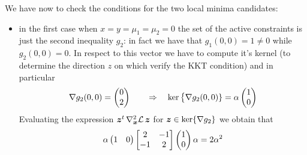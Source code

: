 \begin{example}{}
		We have now to check the conditions for the two local minima candidates:
		\begin{itemize}
			\item in the first case when $x=y = \mu_1 = \mu_2 = 0$ the set of the active constraints is just the second inequality $g_2$: in fact we have that $g_1(0,0) = 1 \neq 0$ while $g_2(0,0) = 0$. In respect to this vector we have to compute it's kernel (to determine the direction $z$ on which verify the KKT condition) and in particular
			\[ \nabla g_2(0,0) = \begin{pmatrix} 0\\ 2 \end{pmatrix} \qquad \Rightarrow \quad \ker\big\{ \nabla g_2(0,0) \} = \alpha \begin{pmatrix} 1 \\ 0 \end{pmatrix} \]
			Evaluating the expression $\boldsymbol{z}^t \, \nabla_{\boldsymbol{x}}^2\mathcal L \, \boldsymbol{z}$ for $\boldsymbol{z}\in \ker\{\nabla g_2\}$ we obtain that
			\[ \alpha \begin{pmatrix} 1 & 0 \end{pmatrix} \begin{bmatrix}  2 & - 1 \\ - 1 & 2  \end{bmatrix} \begin{pmatrix} 1 \\ 0 \end{pmatrix} \alpha = 2\alpha^2  \]
		\end{itemize}
		
	\end{example}
	
